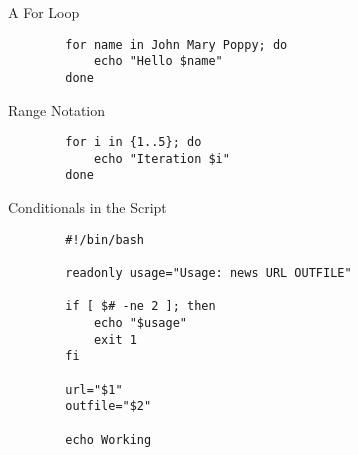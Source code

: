 \documentclass[pdf,usenames,dvipsnames,14pt]{beamer}%
\begin{document}
\begin{frame}[fragile]{A For Loop}
	\begin{verbatim}
		for name in John Mary Poppy; do
		    echo "Hello $name"
		done
	\end{verbatim}
\end{frame}

\begin{frame}[fragile]{Range Notation}
	\begin{verbatim}
		for i in {1..5}; do
		    echo "Iteration $i"
		done
	\end{verbatim}
\end{frame}

\begin{frame}[fragile]{Conditionals in the Script}
	\begin{verbatim}
		#!/bin/bash
		
		readonly usage="Usage: news URL OUTFILE"
		
		if [ $# -ne 2 ]; then
		    echo "$usage"
		    exit 1
		fi
		
		url="$1"
		outfile="$2"
		
		echo Working
	\end{verbatim}
\end{frame}
\end{document}
